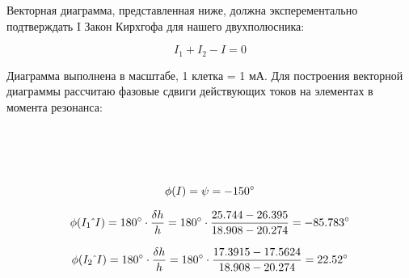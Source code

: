 Векторная диаграмма, представленная ниже, должна эксперементально подтверждать I Закон Кирхгофа для нашего двухполюсника:

\[
	I_1 + I_2 - I = 0
\]

Диаграмма выполнена в масштабе, 1 клетка = 1 мА. Для построения векторной диаграммы рассчитаю фазовые сдвиги действующих токов на элементах в момента резонанса:

\[
	\begin{gathered}
		\vspace*{1.3cm} \\
		\phi(I) = \psi = -150^\circ \\
		\vspace*{-0.3cm} \\
		\phi(I_1 \, \hat{} \, I) = 180^\circ \cdot \frac{\delta h}{h} = 180^\circ \cdot \frac{25.744 - 26.395}{18.908-20.274} = -85.783^\circ \\
		\vspace*{-0.3cm} \\
		\phi(I_2 \, \hat{} \, I) = 180^\circ \cdot \frac{\delta h}{h} = 180^\circ \cdot \frac{17.3915 - 17.5624}{18.908-20.274} = 22.52^\circ \\
		\vspace*{1.4cm} \\
	\end{gathered}
\]

\newpage
\setlength{\columnsep}{0.5cm}

